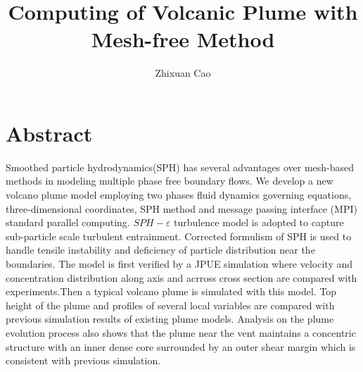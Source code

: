 \documentclass[10pt,a4paper]{article}
\author{Zhixuan Cao}%
\title{Computing of Volcanic Plume with Mesh-free Method}
\begin{document}
\maketitle
\section{Abstract}
Smoothed particle hydrodynamics(SPH) has several advantages over mesh-based methods in modeling multiple phase free boundary flows. We develop a new volcano plume model employing two phases fluid dynamics governing equations, three-dimensional coordinates, SPH method and message passing interface (MPI) standard parallel computing. $SPH-\varepsilon$ turbulence model is adopted to capture sub-particle scale turbulent entrainment. Corrected formulism of SPH is used to handle tensile instability and deficiency of particle distribution near the boundaries. The model is first verified by a JPUE simulation where velocity and concentration distribution along axis and acrross cross section are compared with experiments.Then a typical volcano plume is simulated with this model. Top height of the plume and profiles of several local variables are compared with previous simulation results of existing plume models. Analysis on the plume evolution process also shows that the plume near the vent maintains a concentric structure with an inner dense core surrounded by an outer shear margin which is consistent with previous simulation.
\end{document}
